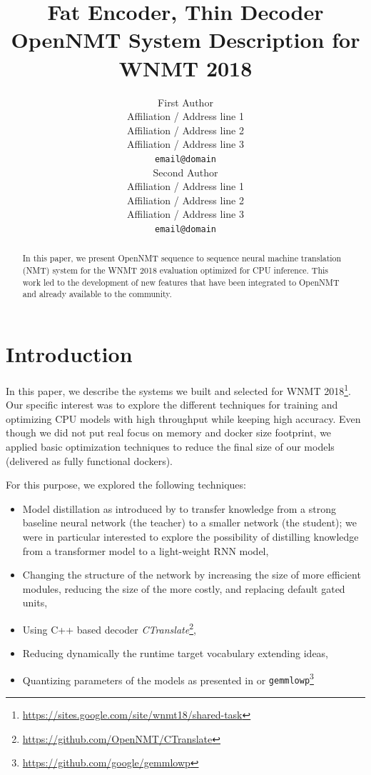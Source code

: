 \documentclass[11pt,a4paper]{article}
\title{Fat Encoder, Thin Decoder \protect\\ OpenNMT System Description for WNMT 2018}
\author{First Author \\
  Affiliation / Address line 1 \\
  Affiliation / Address line 2 \\
  Affiliation / Address line 3 \\
  {\tt email@domain} \\\And
  Second Author \\
  Affiliation / Address line 1 \\
  Affiliation / Address line 2 \\
  Affiliation / Address line 3 \\
  {\tt email@domain} \\}
\date{}
\begin{document}
\maketitle
\begin{abstract}
In this paper, we present OpenNMT sequence to sequence neural machine translation (NMT) system for the WNMT 2018 evaluation optimized for CPU inference. This work led to the development of new features that have been integrated to OpenNMT and already available to the community.

\end{abstract}

\section{Introduction}
In this paper, we describe the systems we built and selected for WNMT 2018\footnote{\url{https://sites.google.com/site/wnmt18/shared-task}}. Our specific interest was to explore the different techniques for training and optimizing CPU models with high throughput while keeping high accuracy. Even though we did not put real focus on memory and docker size footprint, we applied basic optimization techniques to reduce the final size of our models (delivered as fully functional dockers).

For this purpose, we explored the following techniques:
\begin{itemize}
\item Model distillation as introduced by  to transfer knowledge from a strong baseline neural network (the teacher) to a smaller network (the student); we were in particular interested to explore the possibility of distilling knowledge from a transformer model \cite{vaswani2017attention} to a light-weight RNN model,
\item Changing the structure of the network by increasing the size of more efficient modules, reducing the size of the more costly, and replacing default gated units,
\item Using C++ based decoder \textit{CTranslate}\footnote{\url{https://github.com/OpenNMT/CTranslate}},
\item Reducing dynamically the runtime target vocabulary extending \cite{shi2017speeding} ideas,
\item Quantizing parameters of the models as presented in  or {\tt gemmlowp}\footnote{\url{https://github.com/google/gemmlowp}}
\end{itemize}
\end{document}

